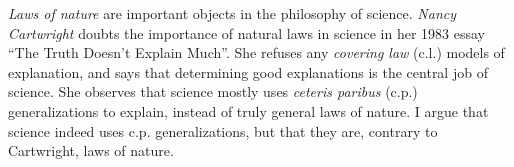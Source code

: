\emph{Laws of nature} are
important objects in the philosophy
of science.
\emph{Nancy Cartwright}
doubts the importance of natural laws in science in her
1983 essay \enquote{The Truth Doesn't Explain Much}.
She refuses any \emph{covering law} (c.l.) models
of explanation, and says that determining good explanations is the central job of science.
She observes that
science mostly uses
\emph{ceteris paribus} (c.p.) generalizations to explain, instead of truly general laws of nature.
I argue that science indeed uses c.p. generalizations,
but that they are, contrary to Cartwright, laws of nature.
